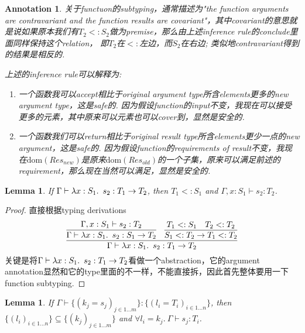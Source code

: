 \documentclass{article}
\theoremstyle{plain}
\newtheorem{lemma}[theorem]{Lemma}
\newtheorem{annotation}[theorem]{Annotation}
\theoremstyle{nonumberplain}
\newtheorem{proof}{Proof}
\newcommand{\lam}[2]{\ensuremath{\lambda #1\ldotp~ #2}} %
\newcommand{\termtype}[2]{\ensuremath{#1:#2}}
\newcommand{\subtyp}[2]{#1<:#2}
\begin{document}
\begin{annotation}
\rm 关于functuon的subtyping，通常描述为"the function arguments are contravariant and the function results are covariant"，其中covariant的意思就是说如果原本我们有$\subtyp{T_2}{S_2}$做为premise，那么由上述inference rule的conclude里面同样保持这个relation， 即$T_2$在$<:$左边，而$S_2$在右边; 类似地contravariant得到的结果是相反的. 

上述的inference rule可以解释为:
\begin{enumerate}
	\item 一个函数我可以accept相比于original argument type所含elements更多的new argument type，这是safe的. 因为假设function的input不变，我现在可以接受更多的元素，其中原来可以元素也可以cover到，显然是安全的. 
	\item 一个函数我们可以return相比于original result type所含elements更少一点的new argument，这是safe的. 因为假设function的requirements of result不变，我现在$\text{dom}(Res_{new})$是原来$\text{dom}(Res_{old})$的一个子集，原来可以满足前述的requirement，那么现在当然可以满足，显然是安全的. 
\end{enumerate}
\end{annotation}

\begin{lemma}
\rm If $\Gamma \vdash \termtype{\lam{\termtype{x}{S_1}}{s_2}}{T_1 \to T_2}$, then $\subtyp{T_1}{S_1}$ and $\Gamma,\termtype{x}{S_1} \vdash \termtype{s_2}{T_2}$. 
\end{lemma}

\begin{proof}
直接根据typing derivations
$$
\infer{\Gamma \vdash \termtype{\lam{\termtype{x}{S_1}}{s_2}}{T_1 \to T_2}}{\infer{\Gamma \vdash \termtype{\lam{\termtype{x}{S_1}}{s_2}}{S_1 \to T_2}}{\Gamma,\termtype{x}{S_1} \vdash \termtype{s_2}{T_2}} & \infer{\subtyp{S_1}{T_2} \to \subtyp{T_1}{T_2}}{\subtyp{T_1}{S_1} & \subtyp{T_2}{T_2}}}
$$
关键是将$\Gamma \vdash \termtype{\lam{\termtype{x}{S_1}}{s_2}}{T_1 \to T_2}$看做一个abstraction，它的argument annotation显然和它的type里面的不一样，不能直接拆，因此首先整体要用一下function subtyping.
\end{proof}

\begin{lemma}
\rm If $\Gamma \vdash \termtype{\{{(k_j = s_j)}_{j \in 1\ldots m}\}}{\{{(l_i = T_i)}_{i \in 1\ldots n}\}}$, then $\{{(l_i)}_{i \in 1\ldots n}\}\subseteq\{{(k_j)}_{j \in 1\ldots m}\}$ and $\forall l_i = k_j.~ \Gamma \vdash \termtype{s_j}{T_i}$.
\end{lemma}
\end{document}
